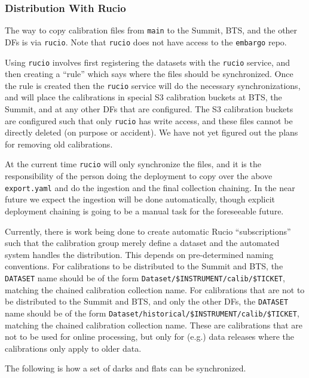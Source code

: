 \documentclass[DM,authoryear,toc]{lsstdoc}
\begin{document}
\subsubsection{Distribution With Rucio}

The way to copy calibration files from \texttt{main} to the Summit, BTS, and the other DFs is via \texttt{rucio}.
Note that \texttt{rucio} does not have access to the \texttt{embargo} repo.

Using \texttt{rucio} involves first registering the datasets with the \texttt{rucio} service, and then creating a ``rule'' which says where the files should be synchronized.
Once the rule is created then the \texttt{rucio} service will do the necessary synchronizations, and will place the calibrations in special S3 calibration buckets at BTS, the Summit, and at any other DFs that are configured.
The S3 calibration buckets are configured such that only \texttt{rucio} has write access, and these files cannot be directly deleted (on purpose or accident).
We have not yet figured out the plans for removing old calibrations.

At the current time \texttt{rucio} will only synchronize the files, and it is the responsibility of the person doing the deployment to copy over the above \texttt{export.yaml} and do the ingestion and the final collection chaining.
In the near future we expect the ingestion will be done automatically, though explicit deployment chaining is going to be a manual task for the foreseeable future.

Currently, there is work being done to create automatic Rucio ``subscriptions'' such that the calibration group merely define a dataset and the automated system handles the distribution.
This depends on pre-determined naming conventions.
For calibrations to be distributed to the Summit and BTS, the \texttt{DATASET} name should be of the form \texttt{Dataset/\$INSTRUMENT/calib/\$TICKET}, matching the chained calibration collection name.
For calibrations that are not to be distributed to the Summit and BTS, and only the other DFs, the \texttt{DATASET} name should be of the form \texttt{Dataset/historical/\$INSTRUMENT/calib/\$TICKET}, matching the chained calibration collection name.
These are calibrations that are not to be used for online processing, but only for (e.g.) data releases where the calibrations only apply to older data.

The following is how a set of darks and flats can be synchronized.
\end{document}
